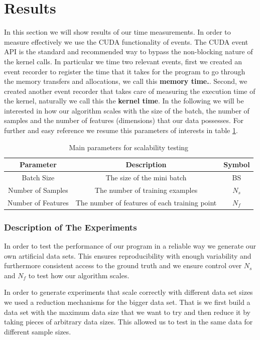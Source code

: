 \documentclass[11pt,a4paper]{article}
\begin{document}
\section{Results}
In this section we will show results of our time measurements. In order to measure effectively we
use the CUDA functionality of events. The CUDA event API is the standard and recommended way to 
bypass the non-blocking  nature of the kernel calls. 
In particular we time two relevant events, first we created an event recorder to 
register the time that it takes for the program to go through the memory transfers 
and allocations, we call this \textbf{memory time.}. Second, we created another event
recorder that takes care of measuring the execution time of the kernel, naturally we 
call this the \textbf{kernel time}. In the following we will be interested in how our 
algorithm scales with the size of the batch, the number of samples and the number 
of features (dimensions) that our data possesses. For further and easy 
reference we resume this parameters of interests in table \ref{table:parameters}.


\begin{table}[H]
\centering
\begin{tabular}{|c|c|c|}
\hline
Parameter & Description & Symbol\\
\hline
Batch Size & The size of the mini batch & BS \\
\hline
Number of Samples & The number of training examples & $N_s$ \\
\hline
Number of Features & The number of features of each training point & $N_f$ \\
\hline
\end{tabular}
\caption{Main parameters for scalability testing}
\label{table:parameters}
\end{table}

\subsubsection*{Description of The Experiments}
In order to test the performance of our program in a reliable way we 
generate our own artificial data sets. This ensures reproducibility with enough
variability and furthermore consistent access to the ground truth and 
we ensure control over $N_s$ and $N_f$ to test how our algorithm scales. 

In order to generate experiments that scale correctly with different
data set sizes we used a reduction mechanisms for the bigger data set. 
That is  we first build a data set with the maximum data size that we want to 
try and then reduce it by taking pieces of arbitrary data sizes. This allowed us
to test in the same data for different sample sizes.
\end{document}
